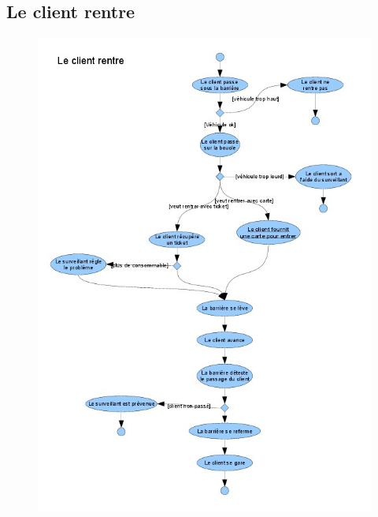 \documentclass[a4paper]{article}
\begin{document}
\subsection{Le client rentre}
\begin{figure}[!ht]
\centering
\includegraphics[scale=.5]{imgs/act_rentre.jpg}
\end{figure}
\newpage
\end{document}
